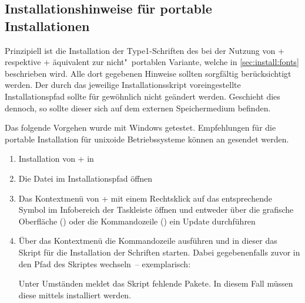 \subsection{%
  Installationshinweise für portable Installationen%
  \label{sec:install:portable}%
}

Prinzipiell ist die Installation der Type1-Schriften des \CDs bei der Nutzung 
von \TeXLive+ respektive \MiKTeX+ äquivalent zur nicht"~portablen Variante, 
welche in \autoref{sec:install:fonts} beschrieben wird. Alle dort gegebenen 
Hinweise sollten sorgfältig berücksichtigt werden. Der durch das jeweilige 
Installationsskript voreingestellte Installationspfad sollte für gewöhnlich 
nicht geändert werden. Geschieht dies dennoch, so sollte dieser sich auf dem 
externen Speichermedium  befinden.


\minisec{\TeXLive+}

Das folgende Vorgehen wurde mit Windows getestet. Empfehlungen für die portable 
Installation für unixoide Betriebssysteme können an \mailto{\TUDScriptContact} 
gesendet werden.
%
\begin{enumerate}
\item Installation von \TeXLive+ in 
\item Die Datei  im Installationspfad öffnen
\item Das Kontextmenü von \TeXLive+ mit einem Rechtsklick auf das entsprechende 
  Symbol im Infobereich der Taskleiste öffnen und entweder über die grafische 
  Oberfläche () oder die Kommandozeile 
  () ein Update durchführen
\item Über das Kontextmenü die Kommandozeile ausführen und in dieser das Skript 
  für die Installation der Schriften  starten. 
  Dabei gegebenenfalls zuvor in den Pfad des Skriptes wechseln~-- exemplarisch:
  \begin{quoting}
  \RET*%
  \RET%
  \end{quoting}
  Unter Umständen meldet das Skript fehlende Pakete. In diesem Fall müssen 
  diese mittels  installiert werden.
\end{enumerate}


